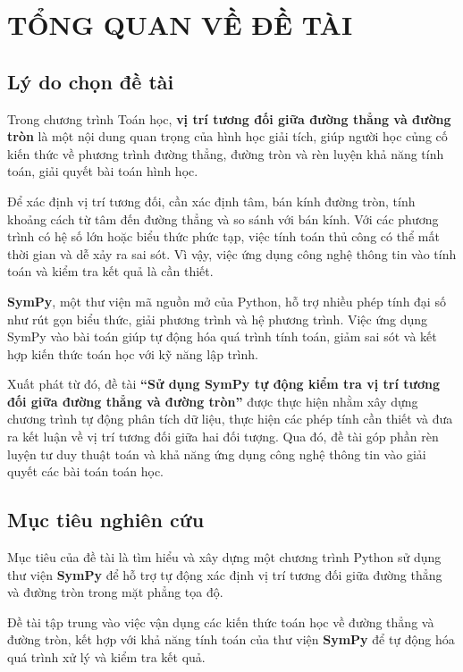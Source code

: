 \documentclass[12pt,a4paper]{article}
\begin{document}
\section{TỔNG QUAN VỀ ĐỀ TÀI}

\subsection{Lý do chọn đề tài}

Trong chương trình Toán học, \textbf{vị trí tương đối giữa đường thẳng và đường tròn} là một nội dung quan trọng của hình học giải tích, giúp người học củng cố kiến thức về phương trình đường thẳng, đường tròn và rèn luyện khả năng tính toán, giải quyết bài toán hình học.

Để xác định vị trí tương đối, cần xác định tâm, bán kính đường tròn, tính khoảng cách từ tâm đến đường thẳng và so sánh với bán kính. Với các phương trình có hệ số lớn hoặc biểu thức phức tạp, việc tính toán thủ công có thể mất thời gian và dễ xảy ra sai sót. Vì vậy, việc ứng dụng công nghệ thông tin vào tính toán và kiểm tra kết quả là cần thiết.

\textbf{SymPy}, một thư viện mã nguồn mở của Python, hỗ trợ nhiều phép tính đại số như rút gọn biểu thức, giải phương trình và hệ phương trình. Việc ứng dụng SymPy vào bài toán giúp tự động hóa quá trình tính toán, giảm sai sót và kết hợp kiến thức toán học với kỹ năng lập trình.

Xuất phát từ đó, đề tài \textbf{``Sử dụng SymPy tự động kiểm tra vị trí tương đối giữa đường thẳng và đường tròn''} được thực hiện nhằm xây dựng chương trình tự động phân tích dữ liệu, thực hiện các phép tính cần thiết và đưa ra kết luận về vị trí tương đối giữa hai đối tượng. Qua đó, đề tài góp phần rèn luyện tư duy thuật toán và khả năng ứng dụng công nghệ thông tin vào giải quyết các bài toán toán học.

\subsection{Mục tiêu nghiên cứu}

Mục tiêu của đề tài là tìm hiểu và xây dựng một chương trình Python sử dụng thư viện
\textbf{SymPy} để hỗ trợ tự động xác định vị trí tương đối giữa đường thẳng và đường tròn
trong mặt phẳng tọa độ.

Đề tài tập trung vào việc vận dụng các kiến thức toán học về đường thẳng và đường tròn,
kết hợp với khả năng tính toán của thư viện \textbf{SymPy} để tự động hóa quá trình xử lý
và kiểm tra kết quả.
\end{document}
